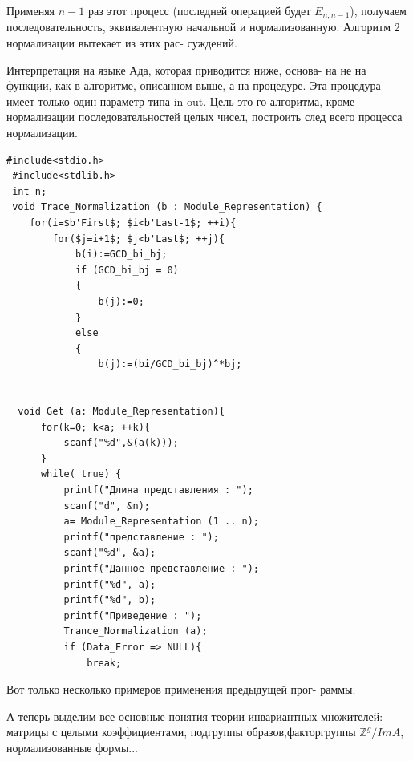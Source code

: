 \documentclass{mai_book}
\begin{document}
\begin{myproof}
\noindent Применяя $n-1$ раз этот процесс (последней операцией будет \linebreak $E_{n, n-1}$), получаем последовательность, эквивалентную начальной и \linebreak нормализованную. Алгоритм 2 нормализации вытекает из этих рас- \linebreak суждений.
\end{myproof}
Интерпретация на языке Ада, которая приводится ниже, основа- \linebreak на не на функции, как в алгоритме, описанном выше, а на процедуре. \linebreak Эта процедура имеет только один параметр типа in out. Цель это-\linebreak го алгоритма, кроме нормализации последовательностей целых чисел, \linebreak построить след всего процесса нормализации.
\begin{lstlisting}[mathescape=true]
 #include<stdio.h>
 #include<stdlib.h>
 int n;   
 void Trace_Normalization (b : Module_Representation) {
    for(i=$b'First$; $i<b'Last-1$; ++i){
        for($j=i+1$; $j<b'Last$; ++j){
            b(i):=GCD_bi_bj;
            if (GCD_bi_bj = 0) 
            {
                b(j):=0; 
            } 
            else 
            {    
                b(j):=(bi/GCD_bi_bj)^*bj;

        
  void Get (a: Module_Representation){
      for(k=0; k<a; ++k){
          scanf("%d",&(a(k)));
      }
      while( true) {
          printf("Длина представления : ");
          scanf("d", &n);
          a= Module_Representation (1 .. n);
          printf("представление : ");
          scanf("%d", &a);
          printf("Данное представление : ");
          printf("%d", a);
          printf("%d", b);
          printf("Приведение : ");
          Trance_Normalization (a);
          if (Data_Error => NULL){
              break;          
\end{lstlisting}
\newpage
Вот только несколько примеров применения предыдущей прог- \linebreak раммы. 
\begin{figure}[h]
\end{figure}
\noindent А теперь выделим все основные понятия теории инвариантных множителей: матрицы с целыми коэффициентами, подгруппы образов,\linebreak факторгруппы $\mathbb{Z}^g/ImA$, нормализованные формы...  
\end{document}

